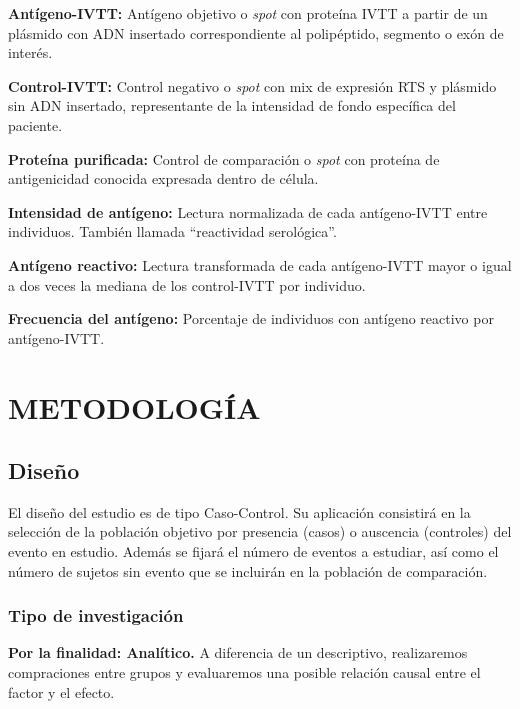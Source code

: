 \documentclass[]{article}
\begin{document}
\begin{enumerate}
\begin{enumerate}
    \textbf{Antígeno-IVTT:} Antígeno objetivo o \emph{spot} con proteína
    IVTT a partir de un plásmido con ADN insertado correspondiente al
    polipéptido, segmento o exón de interés.

    \textbf{Control-IVTT:} Control negativo o \emph{spot} con mix de
    expresión RTS y plásmido sin ADN insertado, representante de la
    intensidad de fondo específica del paciente.

    \textbf{Proteína purificada:} Control de comparación o \emph{spot}
    con proteína de antigenicidad conocida expresada dentro de célula.

    \textbf{Intensidad de antígeno:} Lectura normalizada de cada
    antígeno-IVTT entre individuos. También llamada ``reactividad
    serológica''.

    \textbf{Antígeno reactivo:} Lectura transformada de cada
    antígeno-IVTT mayor o igual a dos veces la mediana de los
    control-IVTT por individuo.

    \textbf{Frecuencia del antígeno:} Porcentaje de individuos con
    antígeno reactivo por antígeno-IVTT.
  \end{enumerate}
\end{enumerate}

\hypertarget{meto}{\section{METODOLOGÍA}\label{meto}}

\subsection{Diseño}\label{diseno}

El diseño del estudio es de tipo Caso-Control. Su aplicación consistirá
en la selección de la población objetivo por presencia (casos) o
auscencia (controles) del evento en estudio. Además se fijará el número
de eventos a estudiar, así como el número de sujetos sin evento que se
incluirán en la población de comparación.

\subsubsection{Tipo de investigación}\label{tipo-de-investigacion}

\textbf{Por la finalidad: Analítico.} A diferencia de un descriptivo,
realizaremos compraciones entre grupos y evaluaremos una posible
relación causal entre el factor y el efecto.
\end{document}
